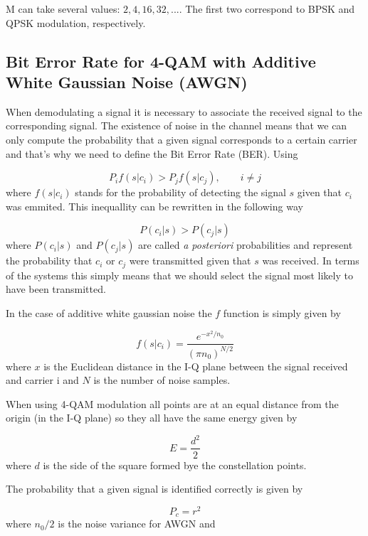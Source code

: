M can take several values: $2, 4, 16, 32, ...$. The first two correspond to BPSK and QPSK modulation, respectively.

\subsection{Bit Error Rate for 4-QAM with Additive White Gaussian Noise (AWGN) }

When demodulating a signal it is necessary to associate the received signal to the corresponding signal. The existence of noise in the channel means that we can only compute the probability that a given signal corresponds to a certain carrier and that's why we need to define the Bit Error Rate (BER). Using

\begin{equation}
P_i f(s|c_i)>P_j f(s|c_j), \qquad i\neq j
\end{equation}
where $f(s|c_i)$ stands for the probability of detecting the signal $s$ given that $c_i$ was emmited. This inequallity can be rewritten in the following way

\begin{equation}
P(c_i|s)>P(c_j|s)
\end{equation}
where $P(c_i|s)$ and $P(c_j|s)$ are called \textit{a posteriori} probabilities and represent the probability that $c_i$ or $c_j$ were transmitted given that $s$ was received. In terms of the systems this simply means that we should select the signal most likely to have been transmitted.

In the case of additive white gaussian noise the $f$ function is simply given by

\begin{equation}
f(s|c_i)=\frac{e^{-x^2/n_0}}{(\pi n_0)^{N/2}}
\end{equation}
where $x$ is the Euclidean distance in the I-Q plane between the signal received and carrier i and $N$ is the number of noise samples.

When using 4-QAM modulation all points are at an equal distance from the origin (in the I-Q plane) so they all have the same energy given by

\begin{equation}
E=\frac{d^2}{2}
\end{equation}
where $d$ is the side of the square formed bye the constellation points.

The probability that a given signal is identified correctly is given by

\begin{equation}
P_c=r^2
\end{equation}
where $n_0/2$ is the noise variance for AWGN and

